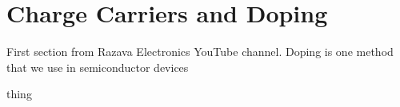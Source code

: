 \section{Charge Carriers and Doping}

First section from Razava Electronics YouTube channel. Doping is one method that we use in semiconductor devices

\begin{define}
    thing
\end{define}